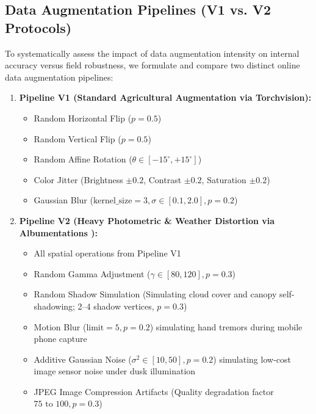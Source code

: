 \documentclass[journal,10pt,twocolumn]{IEEEtran}
\begin{document}
\subsection{Data Augmentation Pipelines (V1 vs. V2 Protocols)}
To systematically assess the impact of data augmentation intensity on internal accuracy versus field robustness, we formulate and compare two distinct online data augmentation pipelines:
\begin{enumerate}[leftmargin=*]
    \item \textbf{Pipeline V1 (Standard Agricultural Augmentation via Torchvision):}
    \begin{itemize}
        \item Random Horizontal Flip ($p = 0.5$)
        \item Random Vertical Flip ($p = 0.5$)
        \item Random Affine Rotation ($\theta \in [-15^\circ, +15^\circ]$)
        \item Color Jitter (Brightness $\pm 0.2$, Contrast $\pm 0.2$, Saturation $\pm 0.2$)
        \item Gaussian Blur ($\text{kernel\_size} = 3, \sigma \in [0.1, 2.0], p = 0.2$)
    \end{itemize}
    \item \textbf{Pipeline V2 (Heavy Photometric \& Weather Distortion via Albumentations \cite{buslaev2020albumentations}):}
    \begin{itemize}
        \item All spatial operations from Pipeline V1
        \item Random Gamma Adjustment ($\gamma \in [80, 120], p = 0.3$)
        \item Random Shadow Simulation (Simulating cloud cover and canopy self-shadowing; 2--4 shadow vertices, $p = 0.3$)
        \item Motion Blur ($\text{limit} = 5, p = 0.2$) simulating hand tremors during mobile phone capture
        \item Additive Gaussian Noise ($\sigma^2 \in [10, 50], p = 0.2$) simulating low-cost image sensor noise under dusk illumination
        \item JPEG Image Compression Artifacts (Quality degradation factor $75 \text{ to } 100, p = 0.3$)
    \end{itemize}
\end{enumerate}
\end{document}
